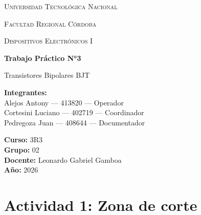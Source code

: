 \documentclass[12pt,a4paper]{article}
\begin{document}
\hypersetup{pageanchor=false}
\begin{titlepage}
    \centering

    {\scshape\LARGE Universidad Tecnológica Nacional \par}
    \vspace{0.3cm}
    {\scshape\Large Facultad Regional Córdoba \par}
    \vspace{1.5cm}

    {\scshape\Large Dispositivos Electrónicos I \par}
    \vspace{2cm}

    {\Huge\bfseries Trabajo Práctico N°3 \par}
    \vspace{0.5cm}
    {\LARGE Transistores Bipolares BJT \par}

    \vspace{2cm}

    \begin{flushleft}
    \textbf{Integrantes:} \\
    Alejos Antony --- 413820 --- Operador\\
    Cortesini Luciano --- 402719 --- Coordinador\\
    Pedregoza Juan --- 408644 --- Documentador\\

    \vspace{0.5cm}

    \textbf{Curso:} 3R3 \\
    \textbf{Grupo:} 02 \\
    \textbf{Docente:}  Leonardo Gabriel Gamboa\\
    \textbf{Año:} 2026 \\
    \end{flushleft}

    \vfill

\end{titlepage}
\hypersetup{pageanchor=true}
\thispagestyle{empty}

\pagestyle{fancy}

\vspace{1cm}

\tableofcontents
\newpage

\section{Actividad 1: Zona de corte}
\end{document}
